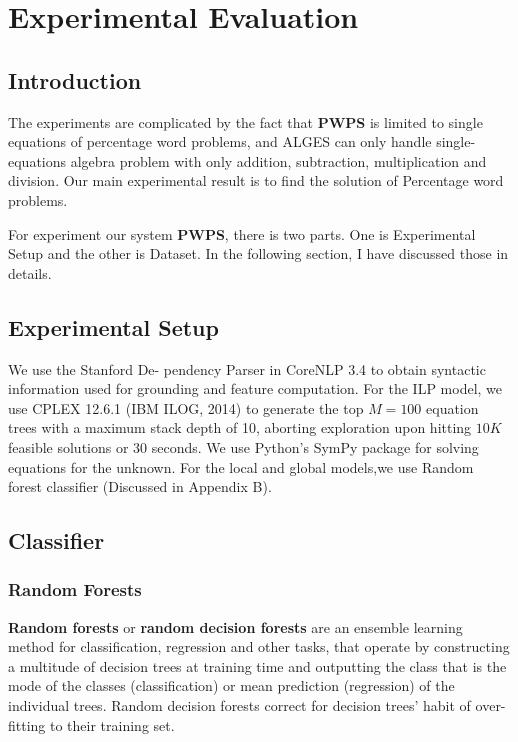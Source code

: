 \documentclass[document.tex]{subfiles}
\begin{document}
\chapter{Experimental Evaluation}
\section{Introduction}
The experiments are complicated by the fact that \textbf{PWPS} is limited to single equations of percentage word problems, and ALGES
can only handle single-equations algebra problem with only addition, subtraction, multiplication and division. Our main experimental result is to find the solution of Percentage word problems.

For experiment our system \textbf{PWPS}, there is two parts. One is Experimental Setup and the other is Dataset. In the following section, I have discussed those in details.
\section{Experimental Setup}
We use the Stanford De-
pendency Parser in CoreNLP 3.4\cite{32} to obtain syntactic information used for
grounding and feature computation. For the ILP
model, we use CPLEX 12.6.1 (IBM ILOG, 2014)\cite{33}
to generate the top $M = 100$ equation trees with
a maximum stack depth of 10, aborting exploration
upon hitting $10K$ feasible solutions or $30$ seconds.
We use Python’s SymPy package for solving equations for the unknown. For the local and global models,we use Random forest classifier \cite{34,35}(Discussed in Appendix B).
\section{Classifier}
\subsection{Random Forests}
\textbf{Random forests} or \textbf{random decision forests} are an ensemble learning method for classification, regression and other tasks, that operate by constructing a multitude of decision trees at training time and outputting the class that is the mode of the classes (classification) or mean prediction (regression) of the individual trees. Random decision forests correct for decision trees' habit of over-fitting to their training set.
\end{document}
